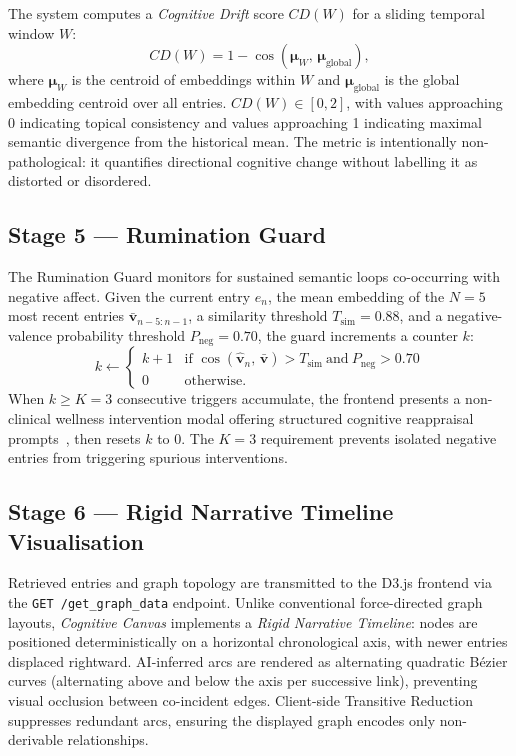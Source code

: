 \documentclass[12pt, letterpaper]{article}
\newcommand{\CC}{\textit{Cognitive Canvas}}
\begin{document}
The system computes a \emph{Cognitive Drift} score $CD(W)$
for a sliding temporal window $W$:
\begin{equation}
CD(W) = 1 - \cos\!\left(\boldsymbol{\mu}_W,\,
  \boldsymbol{\mu}_{\mathrm{global}}\right),
\label{eq:drift}
\end{equation}
where $\boldsymbol{\mu}_W$ is the centroid of embeddings
within $W$ and $\boldsymbol{\mu}_{\mathrm{global}}$ is the
global embedding centroid over all entries.
$CD(W) \in [0,2]$, with values approaching 0 indicating
topical consistency and values approaching 1 indicating
maximal semantic divergence from the historical mean.
The metric is intentionally non-pathological: it quantifies
directional cognitive change without labelling it as
distorted or disordered.

\subsection{Stage 5 --- Rumination Guard}

The Rumination Guard monitors for sustained semantic loops
co-occurring with negative affect.
Given the current entry $e_n$, the mean embedding of the
$N=5$ most recent entries $\bar{\mathbf{v}}_{n-5:n-1}$, a
similarity threshold $T_{\mathrm{sim}} = 0.88$, and a
negative-valence probability threshold
$P_{\mathrm{neg}} = 0.70$, the guard increments a counter
$k$:
\begin{equation}
k \leftarrow
\begin{cases}
k + 1 & \text{if } \cos(\hat{\mathbf{v}}_n,\, \bar{\mathbf{v}})
  > T_{\mathrm{sim}}\ \text{and}\ P_{\mathrm{neg}} > 0.70 \\
0     & \text{otherwise.}
\end{cases}
\label{eq:rumination}
\end{equation}
When $k \geq K = 3$ consecutive triggers accumulate, the
frontend presents a non-clinical wellness intervention modal
offering structured cognitive reappraisal
prompts~\cite{greenberger1995}, then resets $k$ to 0.
The $K=3$ requirement prevents isolated negative entries from
triggering spurious interventions.

\subsection{Stage 6 --- Rigid Narrative Timeline Visualisation}

Retrieved entries and graph topology are transmitted to the
D3.js frontend via the \texttt{GET /get\_graph\_data}
endpoint.
Unlike conventional force-directed graph layouts, \CC{}
implements a \emph{Rigid Narrative Timeline}: nodes are
positioned deterministically on a horizontal chronological
axis, with newer entries displaced rightward.
AI-inferred arcs are rendered as alternating quadratic
B\'{e}zier curves (alternating above and below the axis per
successive link), preventing visual occlusion between
co-incident edges.
Client-side Transitive Reduction~\cite{aho1972} suppresses
redundant arcs, ensuring the displayed graph encodes only
non-derivable relationships.
\end{document}
